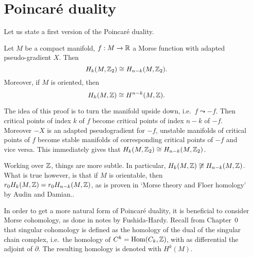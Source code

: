 \section{Poincaré duality}
Let us state a first version of the Poincaré duality.
\begin{theorem}
    Let $M$ be a compact manifold, $f: M \to  \mathbb{R}$ a Morse function with adapted pseudo-gradient $X$.
    Then
    \[
        H_k(M, \mathbb{Z}_2) \cong H_{n-k}(M, \mathbb{Z}_2)
    .\]
    Moreover, if $M$ is oriented, then \[
         H_{k}(M, \mathbb{Z}) \cong H^{n-k}(M, \mathbb{Z})
    .\]
\end{theorem}
\begin{myproof}
    The idea of this proof is to turn the manifold upside down, i.e.\ $f\leadsto -f$.
    Then critical points of index $k$ of $f$  become critical points of index $n-k$ of  $-f$.
    Moreover $-X$ is an adapted pseudogradient for $-f$, unstable manifolds of critical points of $f$ become stable manifolds of corresponding critical points of $-f$ and vice versa.
    This immediately gives that $H_k(M, \mathbb{Z}_2) \cong H_{n-k}(M, \mathbb{Z}_2)$.

    Working over $\mathbb{Z}$, things are more subtle.
    In particular, $H_k(M, \mathbb{Z}) \not \cong H_{n-k}(M, \mathbb{Z})$.
    What is true however, is that if $M$ is orientable, then  $r_0 H_k(M, \mathbb{Z}) = r_0 H_{n-k}(M, \mathbb{Z})$, as is proven in `Morse theory and Floer homology' by Audin and Damian..

    In order to get a more natural form of Poincaré duality, it is beneficial to consider Morse cohomology, as done in notes by Fushida-Hardy.
    Recall from Chapter~0 that singular cohomology is defined as the homology of the dual of the singular chain complex, i.e.\ the homology of $C^{k} = \operatorname{Hom}(C_k, \mathbb{Z})$, with as differential the adjoint of $\partial$. The resulting homology is denoted with $H^{k}(M)$.


\end{myproof}
